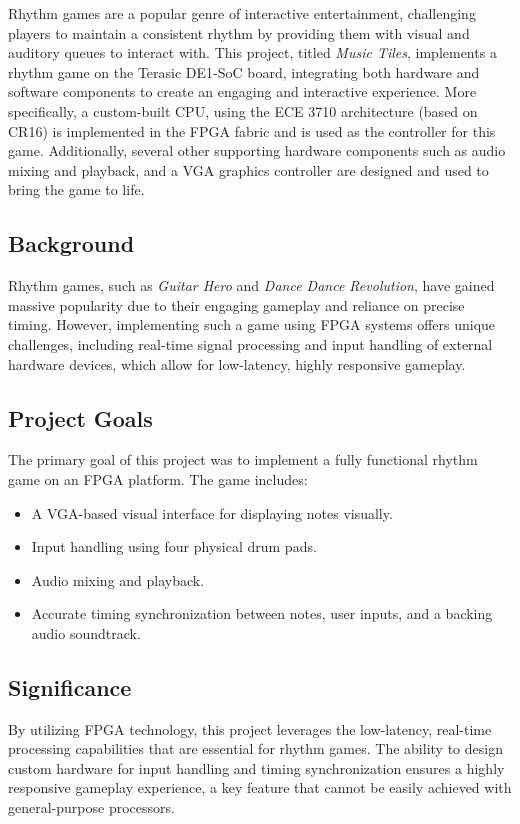 \documentclass{article}
\begin{document}
Rhythm games are a popular genre of interactive entertainment, challenging players to
maintain a consistent rhythm by providing them with visual and auditory queues to 
interact with. 
This project, titled \textit{Music Tiles}, implements a rhythm game on the Terasic DE1-SoC board,
integrating both hardware and software components to create an engaging and interactive experience.
More specifically, a custom-built CPU, using the ECE 3710 architecture (based on CR16) is 
implemented in the FPGA fabric and is used as the controller for this game.
Additionally, several other supporting hardware components such as audio mixing and 
playback, and a VGA graphics controller are designed and used to bring the game to life. 

\subsection{Background}

Rhythm games, such as \textit{Guitar Hero} and \textit{Dance Dance Revolution}, have 
gained massive popularity due to their engaging gameplay and reliance on precise timing. 
However, implementing such a game using FPGA systems offers unique challenges, 
including real-time signal processing and input handling 
of external hardware devices, which allow for low-latency, highly responsive gameplay.

\subsection{Project Goals}
The primary goal of this project was to implement a fully functional rhythm game on an FPGA 
platform. The game includes:
\begin{itemize}
    \item A VGA-based visual interface for displaying notes visually.
    \item Input handling using four physical drum pads.
    \item Audio mixing and playback.
    \item Accurate timing synchronization between notes, user inputs, and a backing audio soundtrack.
\end{itemize}

\subsection{Significance}

By utilizing FPGA technology, this project leverages the low-latency, real-time processing capabilities that are essential for rhythm games. The ability to design custom hardware for input handling and timing synchronization ensures a highly responsive gameplay experience, a key feature that cannot be easily achieved with general-purpose processors.
\end{document}

